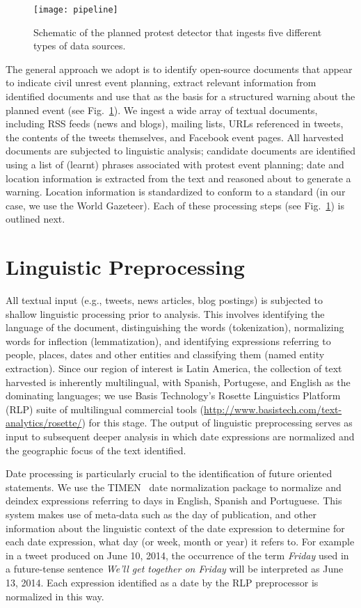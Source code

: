 \begin{figure}
\centering
\texttt{[image: pipeline]}
\caption{Schematic of the planned protest detector that ingests five
different types of data sources.}
\label{flowchart}
\end{figure}
The general approach we adopt is to identify open-source documents
that appear to indicate civil unrest event planning, extract
relevant information from identified documents and use that as the
basis for a structured warning about the planned event (see Fig.~\ref{flowchart}).
We ingest a
wide array of textual documents, including RSS feeds (news and blogs),
mailing lists, URLs referenced in tweets, the contents of the tweets themselves,
and Facebook event pages.
All harvested documents are subjected to linguistic analysis; candidate
documents are identified using a list of (learnt) phrases associated with
protest event planning; date and location information is extracted from the
text and reasoned about to generate a warning. Location information is standardized
to conform to a standard (in our case, we use the World Gazeteer).
Each of these processing
steps (see Fig.~\ref{flowchart}) is outlined next.

\section{Linguistic Preprocessing}
All textual input (e.g., tweets, news articles, blog postings) is
subjected to shallow linguistic processing prior to analysis.  This
involves identifying the language of the document, distinguishing
the words (tokenization), normalizing words for inflection
(lemmatization), and identifying expressions referring to people,
places, dates and other entities and classifying them (named entity extraction). 
Since our region of interest is Latin America, the collection of text
harvested is inherently multilingual, with Spanish, Portugese, and English as
the dominating languages;
we use Basis Technology's Rosette Linguistics Platform (RLP) suite of multilingual commercial tools (\url{http://www.basistech.com/text-analytics/rosette/}) for this stage.
The output of linguistic preprocessing serves as input to subsequent deeper analysis in which 
date expressions are normalized and the geographic focus of the text identified.

Date processing is particularly crucial to the identification of
future oriented statements. We use the TIMEN~\cite{LlorensDGS12} date
normalization package to normalize and deindex expressions referring
to days in English, Spanish and Portuguese. This system makes use of
meta-data such as the day of publication, and other information about
the linguistic context of the date expression to determine for each
date expression, what day (or week, month or year) it refers to.  For
example in a tweet produced on June 10, 2014, the occurrence of the
term {\em Friday} used in a future-tense sentence {\em We'll get
  together on Friday} will be interpreted as June 13, 2014.  Each
expression identified as a date by the RLP preprocessor is normalized
in this way.

